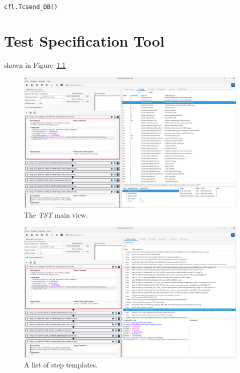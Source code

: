\texttt{cfl.Tcsend\_DB()}

\chapter{Test Specification Tool}
shown in Figure~\ref{fig:tstmain}

\begin{figure}\label{fig:tstmain}
\includegraphics[width=1.\textwidth]{../shared/images/tst.png} 
\caption{The \emph{TST} main view.}
\end{figure}

\begin{figure}\label{fig:tstsnips}
\includegraphics[width=1.\textwidth]{../shared/images/tst_snips.png} 
\caption{A list of step templates.}
\end{figure}

